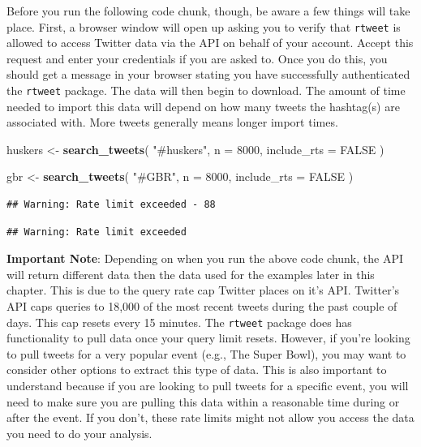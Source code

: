 \documentclass[
]{book}
\newenvironment{Shaded}{\begin{snugshade}}{\end{snugshade}}
\newcommand{\DataTypeTok}[1]{\textcolor[rgb]{0.13,0.29,0.53}{#1}}
\newcommand{\DecValTok}[1]{\textcolor[rgb]{0.00,0.00,0.81}{#1}}
\newcommand{\KeywordTok}[1]{\textcolor[rgb]{0.13,0.29,0.53}{\textbf{#1}}}
\newcommand{\NormalTok}[1]{#1}
\newcommand{\OtherTok}[1]{\textcolor[rgb]{0.56,0.35,0.01}{#1}}
\newcommand{\StringTok}[1]{\textcolor[rgb]{0.31,0.60,0.02}{#1}}
\begin{document}
Before you run the following code chunk, though, be aware a few things will take place. First, a browser window will open up asking you to verify that \texttt{rtweet} is allowed to access Twitter data via the API on behalf of your account. Accept this request and enter your credentials if you are asked to. Once you do this, you should get a message in your browser stating you have successfully authenticated the \texttt{rtweet} package. The data will then begin to download. The amount of time needed to import this data will depend on how many tweets the hashtag(s) are associated with. More tweets generally means longer import times.

\begin{Shaded}
\begin{Highlighting}[]
\NormalTok{huskers <-}\StringTok{ }\KeywordTok{search_tweets}\NormalTok{(}
  \StringTok{"#huskers"}\NormalTok{, }\DataTypeTok{n =} \DecValTok{8000}\NormalTok{, }\DataTypeTok{include_rts =} \OtherTok{FALSE}
\NormalTok{)}

\NormalTok{gbr <-}\StringTok{ }\KeywordTok{search_tweets}\NormalTok{(}
  \StringTok{"#GBR"}\NormalTok{, }\DataTypeTok{n =} \DecValTok{8000}\NormalTok{, }\DataTypeTok{include_rts =} \OtherTok{FALSE}
\NormalTok{)}
\end{Highlighting}
\end{Shaded}

\begin{verbatim}
## Warning: Rate limit exceeded - 88
\end{verbatim}

\begin{verbatim}
## Warning: Rate limit exceeded
\end{verbatim}

\textbf{Important Note}: Depending on when you run the above code chunk, the API will return different data then the data used for the examples later in this chapter. This is due to the query rate cap Twitter places on it's API. Twitter's API caps queries to 18,000 of the most recent tweets during the past couple of days. This cap resets every 15 minutes. The \texttt{rtweet} package does has functionality to pull data once your query limit resets. However, if you're looking to pull tweets for a very popular event (e.g., The Super Bowl), you may want to consider other options to extract this type of data. This is also important to understand because if you are looking to pull tweets for a specific event, you will need to make sure you are pulling this data within a reasonable time during or after the event. If you don't, these rate limits might not allow you access the data you need to do your analysis.
\end{document}
